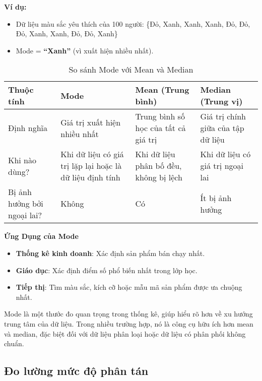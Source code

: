 \textbf{Ví dụ:}
\begin{itemize}
    \item Dữ liệu màu sắc yêu thích của 100 người: \{Đỏ, Xanh, Xanh, Xanh, Đỏ, Đỏ, Đỏ, Xanh, Xanh, Đỏ, Đỏ, Xanh\}
    \item Mode = \textbf{``Xanh''} (vì xuất hiện nhiều nhất).
\end{itemize}

\begin{table}[h]
    \centering
    \renewcommand{\arraystretch}{1.5} %
    \begin{tabular}{|p{3cm}|p{3.5cm}|p{3.5cm}|p{3.5cm}|} %
        \hline
        \textbf{Thuộc tính} & \textbf{Mode} & \textbf{Mean (Trung bình)} & \textbf{Median (Trung vị)} \\
        \hline
        Định nghĩa & Giá trị xuất hiện nhiều nhất & Trung bình số học của tất cả giá trị & Giá trị chính giữa của tập dữ liệu \\
        \hline
        Khi nào dùng? & Khi dữ liệu có giá trị lặp lại hoặc là dữ liệu định tính & Khi dữ liệu phân bố đều, không bị lệch & Khi dữ liệu có giá trị ngoại lai \\
        \hline
        Bị ảnh hưởng bởi ngoại lai? & Không & Có & Ít bị ảnh hưởng \\
        \hline
    \end{tabular}
    \caption{So sánh Mode với Mean và Median}
    \label{tab:comparison}
\end{table}


\textbf{Ứng Dụng của Mode}
\begin{itemize}
    \item \textbf{Thống kê kinh doanh}: Xác định sản phẩm bán chạy nhất.
    \item \textbf{Giáo dục}: Xác định điểm số phổ biến nhất trong lớp học.
    \item \textbf{Tiếp thị}: Tìm màu sắc, kích cỡ hoặc mẫu mã sản phẩm được ưa chuộng nhất.
\end{itemize}

Mode là một thước đo quan trọng trong thống kê, giúp hiểu rõ hơn về xu hướng trung tâm của dữ liệu. Trong nhiều trường hợp, nó là công cụ hữu ích hơn mean và median, đặc biệt đối với dữ liệu phân loại hoặc dữ liệu có phân phối không chuẩn.



\subsection{Đo lường mức độ phân tán}
